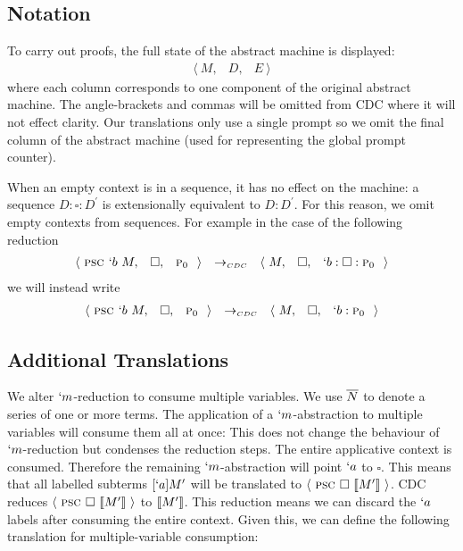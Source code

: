 \subsection{Notation}
To carry out proofs, the full state of the abstract machine is displayed:
\[
\begin{array}{lll}
  \langle\ M, & D, & E\ \rangle
\end{array}
\]
where each column corresponds to one component of the original abstract machine.
The angle-brackets and commas will be omitted from CDC where it will not effect clarity.
Our translations only use a single prompt so we omit the final column of the abstract machine 
(used for representing the global prompt counter).

When an empty context is in a sequence, it has no effect on the machine:
a sequence $D:\square:D^\prime$ is extensionally equivalent to $D:D^\prime$.
For this reason, we omit empty contexts from sequences.
For example in the case of the following reduction
\[
\begin{array}{lllclll}
  \langle\ \psc `b\ M, & \square, & \gp\ \rangle & \tocdc\ & \langle\ M, & \square, & `b:\square:\gp\ \rangle 
\end{array}
\]
we will instead write
\[
\begin{array}{lllclll}
  \langle\ \psc `b\ M, & \square, & \gp\ \rangle & \tocdc\ & \langle\ M, & \square, & `b:\gp\ \rangle
\end{array}
\]

\subsection{Additional Translations}
We alter $`m$-reduction to consume multiple variables.
We use $\overline{N}$ to denote a series of one or more terms.
The application of a $`m$-abstraction to multiple variables will consume them all at once:
This does not change the behaviour of $`m$-reduction but condenses the reduction steps.
The entire applicative context is consumed.
Therefore the remaining $`m$-abstraction will point $`a$ to $\square$.
This means that all labelled subterms $[`a]M'$ will be translated to $\langle\ \psc \square\ \tr{M'}\ \rangle$.
CDC reduces $\langle\ \psc \square\ \tr{M'}\ \rangle$ to $\llbracket M' \rrbracket$.
This reduction means we can discard the $`a$ labels after consuming the entire context.
Given this, we can define the following translation for multiple-variable consumption:

